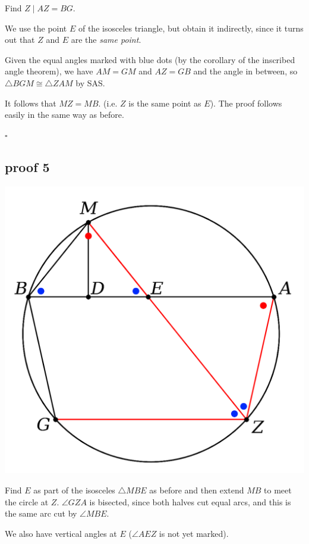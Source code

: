\documentclass[11pt, oneside]{article}
\begin{document}
Find $Z \mid AZ = BG$.

We use the point $E$ of the isosceles triangle, but obtain it indirectly, since it turns out that $Z$ and $E$ are the \emph{same point}.

Given the equal angles marked with blue dots (by the corollary of the inscribed angle theorem), we have $AM = GM$ and $AZ = GB$ and the angle in between, so $\triangle BGM \cong \triangle ZAM$ by SAS.

It follows that $MZ = MB$.  (i.e. $Z$ is the same point as $E$).  The proof follows easily in the same way as before.

$\square$

\subsection*{proof 5}

\begin{center} \includegraphics [scale=0.40] {bc5.png} \end{center}

Find $E$ as part of the isosceles $\triangle MBE$ as before and then extend $MB$ to meet the circle at $Z$.  $\angle GZA$ is bisected, since both halves cut equal arcs, and this is the same arc cut by $\angle MBE$.

We also have vertical angles at $E$ ($\angle AEZ$ is not yet marked).
\end{document}
